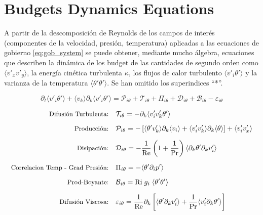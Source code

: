 \chapter{Budgets Dynamics Equations} \label{apen:budgets}

A partir de la descomposición de Reynolds de los campos de interés (componentes de la velocidad, presión, temperatura) aplicadas a las ecuaciones de gobierno \ref{eq:gob_system} se puede obtener, mediante mucho álgebra, ecuaciones que describen la dinámica de los budget de las cantidades de segundo orden como $\langle v'_x v'_y \rangle$, la energía cinética turbulenta $\kappa$, los flujos de calor turbulento $\langle v'_i \theta' \rangle$ y la varianza de la temperatura $\langle \theta' \theta' \rangle$. Se han omitido los superindices ``*''.

\begin{equation}
\partial_t \langle v'_i \theta' \rangle + \langle v_k \rangle \partial_k \langle v'_i \theta' \rangle = \mathcal{P}_{i\theta} + \mathcal{T}_{i\theta} + \Pi_{i\theta} + \mathcal{D}_{i\theta} + \mathcal{B}_{i\theta} - \varepsilon_{i\theta}
\end{equation}

\vspace*{-1cm}

\begin{equation}
\begin{aligned}
\mbox{\small Difusión Turbulenta:}\quad 
& \mathcal{T}_{i\theta} = - \partial_k \langle v'_i v'_k \theta' \rangle \\[2mm]
\mbox{\small Producción:}\quad 
& \mathcal{P}_{i\theta} = - \left[ \langle \theta' v'_k \rangle \partial_k \langle v_i \rangle + \langle v'_i v'_k \rangle \partial_k \langle \theta \rangle \right] + \langle v'_i v'_x \rangle \\[2mm]
\mbox{\small Disipación:}\quad 
& \mathcal{D}_{i\theta} = - \frac{1}{\text{Re}} \left(1 + \frac{1}{\text{Pr}} \right) \langle \partial_k \theta' \partial_k v'_i \rangle \\[2mm]
\mbox{\small Correlacion Temp - Grad Presión:}\quad 
& \Pi_{i\theta} = - \langle \theta' \partial_i p' \rangle \\[2mm]
\mbox{\small Prod-Boyante:}\quad 
& \mathcal{B}_{i\theta} = \text{Ri} \hspace{1mm} g_i  \hspace{1mm} \langle \theta' \theta' \rangle \\[2mm]
\mbox{\small Difusión Viscosa:}\quad 
& \varepsilon_{i\theta} = \frac{1}{\text{Re}} \partial_k \left[ \langle \theta' \partial_k v'_i \rangle 
+ \frac{1}{\text{Pr}} \langle v'_i \partial_k \theta' \rangle \right] \\[2mm]
\end{aligned}
\end{equation}

